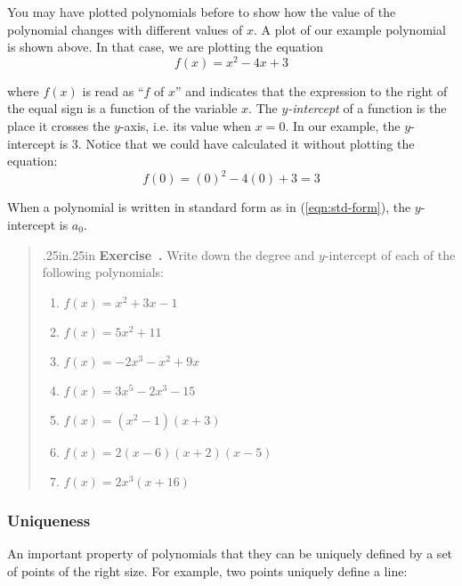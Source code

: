 \documentclass[12 pt]{article}
\newcounter{exercise}[section]
\newenvironment{exercise}{\refstepcounter{exercise}\par\bigskip \begin{quotation}{}{\leftmargin .25in\rightmargin .25in}
    \noindent \textbf{Exercise~\thesection.\theexercise }  \rmfamily}{\end{quotation}\par\bigskip}
\newcounter{example}[section]
\begin{document}
You may have plotted polynomials before to show how the value of the polynomial changes 
with different values of $x$. A plot of our example polynomial is shown above.
In that case, we are plotting the equation 
\[
    f(x) = x^2 - 4x + 3
\]

where $f(x)$ is read as ``$f$ of $x$'' and indicates that the expression 
to the right of the equal sign is a function of the variable $x$. 
The \emph{$y$-intercept} of a function is the place it crosses the $y$-axis, 
i.e. its value when $x=0$. In our example, the $y$-intercept is 3. Notice 
that we could have calculated it without plotting the equation:
\[
    f(0) = (0)^2 - 4(0) + 3 = 3
\]



When a polynomial is written in standard form as in (\ref{eqn:std-form}), 
the $y$-intercept is $a_0$.



\begin{exercise}
    Write down the degree and $y$-intercept of each of the following 
    polynomials:
    \renewcommand{\labelenumi}{(\alph{enumi})} 
    \begin{enumerate}
        \item $f(x) = x^2 + 3x - 1$
        \item $f(x) = 5x^2 + 11$
        \item $f(x) = -2x^3 - x^2 + 9x$
        \item $f(x) = 3x^5 - 2x^3 - 15$
        \item $f(x) = (x^2-1)(x+3)$
        \item $f(x) = 2(x-6)(x+2)(x-5)$
        \item $f(x) = 2x^3(x+16)$
    \end{enumerate}
\end{exercise}

\subsubsection{Uniqueness}\label{sec:unique}

An important property of polynomials that they can be uniquely defined 
by a set of points of the right size. For example, two points uniquely 
define a line:
\end{document}
